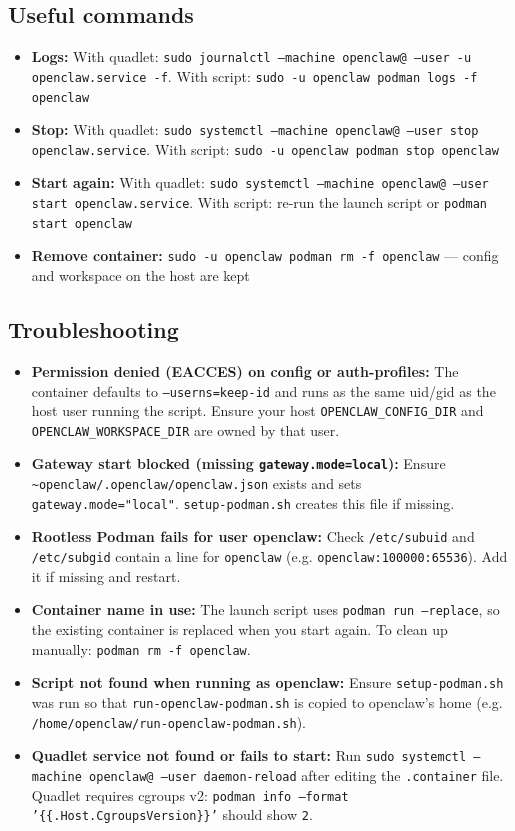 \subsection{Useful commands}


\begin{itemize}
  \item \textbf{Logs:} With quadlet: \texttt{sudo journalctl --machine openclaw@ --user -u openclaw.service -f}. With script: \texttt{sudo -u openclaw podman logs -f openclaw}
  \item \textbf{Stop:} With quadlet: \texttt{sudo systemctl --machine openclaw@ --user stop openclaw.service}. With script: \texttt{sudo -u openclaw podman stop openclaw}
  \item \textbf{Start again:} With quadlet: \texttt{sudo systemctl --machine openclaw@ --user start openclaw.service}. With script: re-run the launch script or \texttt{podman start openclaw}
  \item \textbf{Remove container:} \texttt{sudo -u openclaw podman rm -f openclaw} — config and workspace on the host are kept
\end{itemize}


\subsection{Troubleshooting}


\begin{itemize}
  \item \textbf{Permission denied (EACCES) on config or auth-profiles:} The container defaults to \texttt{--userns=keep-id} and runs as the same uid/gid as the host user running the script. Ensure your host \texttt{OPENCLAW\_CONFIG\_DIR} and \texttt{OPENCLAW\_WORKSPACE\_DIR} are owned by that user.
  \item \textbf{Gateway start blocked (missing \texttt{gateway.mode=local}):} Ensure \texttt{\textasciitilde{}openclaw/.openclaw/openclaw.json} exists and sets \texttt{gateway.mode="local"}. \texttt{setup-podman.sh} creates this file if missing.
  \item \textbf{Rootless Podman fails for user openclaw:} Check \texttt{/etc/subuid} and \texttt{/etc/subgid} contain a line for \texttt{openclaw} (e.g. \texttt{openclaw:100000:65536}). Add it if missing and restart.
  \item \textbf{Container name in use:} The launch script uses \texttt{podman run --replace}, so the existing container is replaced when you start again. To clean up manually: \texttt{podman rm -f openclaw}.
  \item \textbf{Script not found when running as openclaw:} Ensure \texttt{setup-podman.sh} was run so that \texttt{run-openclaw-podman.sh} is copied to openclaw’s home (e.g. \texttt{/home/openclaw/run-openclaw-podman.sh}).
  \item \textbf{Quadlet service not found or fails to start:} Run \texttt{sudo systemctl --machine openclaw@ --user daemon-reload} after editing the \texttt{.container} file. Quadlet requires cgroups v2: \texttt{podman info --format '\{\{.Host.CgroupsVersion\}\}'} should show \texttt{2}.
\end{itemize}


